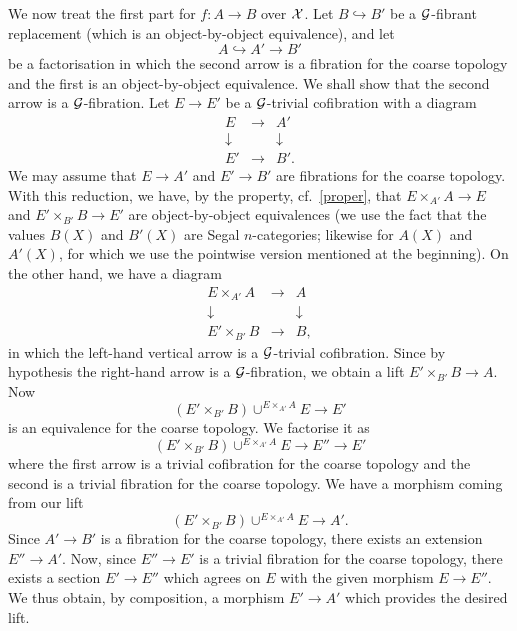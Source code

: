 We now treat the first part for $f:A\rightarrow B$ over
${\cal X}$. Let $B\hookrightarrow B'$ be a ${\cal G}$-fibrant replacement
(which is an object-by-object equivalence), and let
$$
A\hookrightarrow A'\rightarrow B'
$$
be a factorisation in which the second arrow is a fibration for the
coarse
topology and the first is an object-by-object equivalence.
We shall show that the second arrow is a ${\cal G}$-fibration. Let
$E\rightarrow
E'$ be a ${\cal G}$-trivial cofibration with a diagram
$$
\begin{array}{ccc}
E&\rightarrow & A'\\
\downarrow && \downarrow \\
E'&\rightarrow & B'.
\end{array}
$$
We may assume that $E\rightarrow A'$ and $E'\rightarrow B'$ are fibrations
for the coarse topology. With this reduction, we have, by the property,
cf.\ \ref{proper}, that
$E\times _{A'}A\rightarrow E$ and $E'\times _{B'}B\rightarrow E'$ are
object-by-object equivalences (we use the fact that the values $B(X)$ and
$B'(X)$ are Segal $n$-categories; likewise for $A(X)$ and $A'(X)$,
for which we use the pointwise version mentioned at the beginning).
On the other hand,
we have a diagram
$$
\begin{array}{ccc}
E\times _{A'}A&\rightarrow & A\\
\downarrow && \downarrow \\
E'\times _{B'}B&\rightarrow & B,
\end{array}
$$
in which the left-hand vertical arrow is a ${\cal G}$-trivial cofibration.
Since by hypothesis the right-hand arrow is a ${\cal G}$-fibration,
we obtain a lift $E'\times _{B'}B\rightarrow A$. Now
$$
(E'\times _{B'}B)\cup ^{E\times _{A'}A}E\rightarrow E'
$$
is an equivalence for the coarse topology.
We factorise it as
$$
(E'\times _{B'}B)\cup ^{E\times _{A'}A}E\rightarrow E''\rightarrow E'
$$
where the first arrow is a trivial cofibration for the coarse
topology and the second is a trivial fibration for the
coarse topology. We have a morphism coming from our lift
$$
(E'\times _{B'}B) \cup ^{E\times _{A'}A}E \rightarrow A'.
$$
Since $A'\rightarrow B'$ is a fibration for the
coarse topology, there exists an extension $E''\rightarrow A'$.
Now, since $E''\rightarrow E'$ is a trivial fibration for
the coarse topology, there exists a section $E'\rightarrow E''$
which agrees on $E$ with the given morphism $E\rightarrow E''$.
We thus obtain, by composition, a morphism $E'\rightarrow A'$ which provides the
desired lift.



